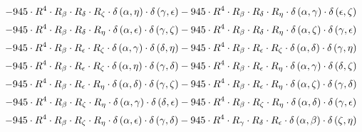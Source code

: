 \begin{subequations}
\begin{gather}
 \\[0.2em] \notag 		 - 945 \cdot R^{4} \cdot R_{\beta{}} \cdot R_{\delta{}} \cdot R_{\zeta{}} \cdot \delta{}\left(\alpha{}, \eta{}\right) \cdot \delta{}\left(\gamma{}, \epsilon{}\right)- 945 \cdot R^{4} \cdot R_{\beta{}} \cdot R_{\delta{}} \cdot R_{\eta{}} \cdot \delta{}\left(\alpha{}, \gamma{}\right) \cdot \delta{}\left(\epsilon{}, \zeta{}\right) 
 \\[0.2em] \notag 		 - 945 \cdot R^{4} \cdot R_{\beta{}} \cdot R_{\delta{}} \cdot R_{\eta{}} \cdot \delta{}\left(\alpha{}, \epsilon{}\right) \cdot \delta{}\left(\gamma{}, \zeta{}\right)- 945 \cdot R^{4} \cdot R_{\beta{}} \cdot R_{\delta{}} \cdot R_{\eta{}} \cdot \delta{}\left(\alpha{}, \zeta{}\right) \cdot \delta{}\left(\gamma{}, \epsilon{}\right) 
 \\[0.2em] \notag 		 - 945 \cdot R^{4} \cdot R_{\beta{}} \cdot R_{\epsilon{}} \cdot R_{\zeta{}} \cdot \delta{}\left(\alpha{}, \gamma{}\right) \cdot \delta{}\left(\delta{}, \eta{}\right)- 945 \cdot R^{4} \cdot R_{\beta{}} \cdot R_{\epsilon{}} \cdot R_{\zeta{}} \cdot \delta{}\left(\alpha{}, \delta{}\right) \cdot \delta{}\left(\gamma{}, \eta{}\right) 
 \\[0.2em] \notag 		 - 945 \cdot R^{4} \cdot R_{\beta{}} \cdot R_{\epsilon{}} \cdot R_{\zeta{}} \cdot \delta{}\left(\alpha{}, \eta{}\right) \cdot \delta{}\left(\gamma{}, \delta{}\right)- 945 \cdot R^{4} \cdot R_{\beta{}} \cdot R_{\epsilon{}} \cdot R_{\eta{}} \cdot \delta{}\left(\alpha{}, \gamma{}\right) \cdot \delta{}\left(\delta{}, \zeta{}\right) 
 \\[0.2em] \notag 		 - 945 \cdot R^{4} \cdot R_{\beta{}} \cdot R_{\epsilon{}} \cdot R_{\eta{}} \cdot \delta{}\left(\alpha{}, \delta{}\right) \cdot \delta{}\left(\gamma{}, \zeta{}\right)- 945 \cdot R^{4} \cdot R_{\beta{}} \cdot R_{\epsilon{}} \cdot R_{\eta{}} \cdot \delta{}\left(\alpha{}, \zeta{}\right) \cdot \delta{}\left(\gamma{}, \delta{}\right) 
 \\[0.2em] \notag 		 - 945 \cdot R^{4} \cdot R_{\beta{}} \cdot R_{\zeta{}} \cdot R_{\eta{}} \cdot \delta{}\left(\alpha{}, \gamma{}\right) \cdot \delta{}\left(\delta{}, \epsilon{}\right)- 945 \cdot R^{4} \cdot R_{\beta{}} \cdot R_{\zeta{}} \cdot R_{\eta{}} \cdot \delta{}\left(\alpha{}, \delta{}\right) \cdot \delta{}\left(\gamma{}, \epsilon{}\right) 
 \\[0.2em] \notag 		 - 945 \cdot R^{4} \cdot R_{\beta{}} \cdot R_{\zeta{}} \cdot R_{\eta{}} \cdot \delta{}\left(\alpha{}, \epsilon{}\right) \cdot \delta{}\left(\gamma{}, \delta{}\right)- 945 \cdot R^{4} \cdot R_{\gamma{}} \cdot R_{\delta{}} \cdot R_{\epsilon{}} \cdot \delta{}\left(\alpha{}, \beta{}\right) \cdot \delta{}\left(\zeta{}, \eta{}\right) 

\end{gather}
\end{subequations}
